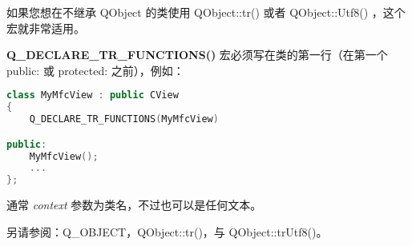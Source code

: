 如果您想在不继承 QObject 的类使用 QObject::tr() 或者 QObject::Utf8() ，这个宏就非常适用。

\textbf{Q\_DECLARE\_TR\_FUNCTIONS()} 宏必须写在类的第一行（在第一个 public: 或
protected: 之前），例如：

\begin{lstlisting}[language=C++]
class MyMfcView : public CView
{
    Q_DECLARE_TR_FUNCTIONS(MyMfcView)

public:
    MyMfcView();
    ...
};
\end{lstlisting}

通常 \emph{context} 参数为类名，不过也可以是任何文本。

另请参阅：Q\_OBJECT，QObject::tr()，与 QObject::trUtf8()。

